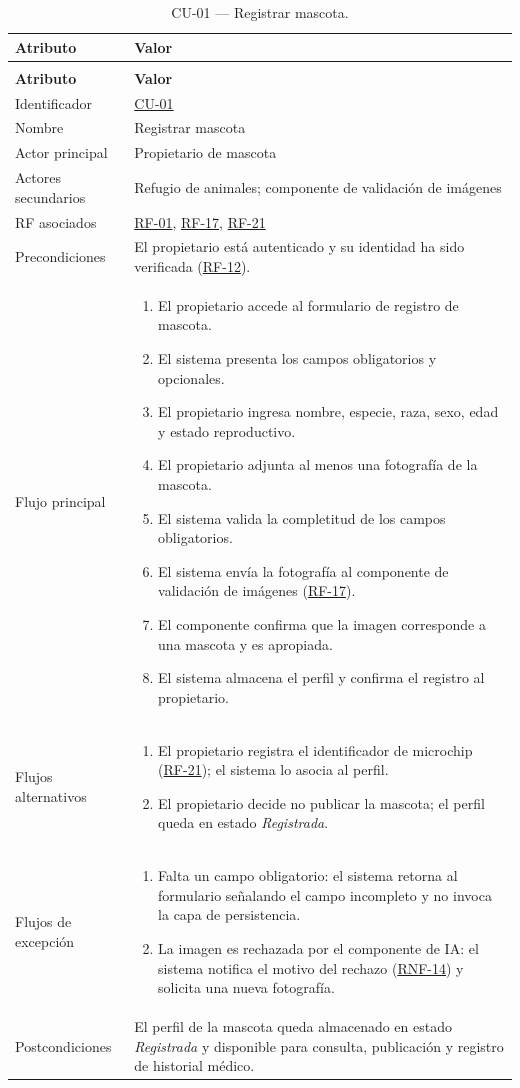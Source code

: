 \documentclass[journal,onecolumn]{IEEEtran}
\makeatletter
\newenvironment{atributos}[2]{%
	\small
	\begin{longtable}{@{}>{\raggedright\arraybackslash}p{4.2cm} >{\raggedright\arraybackslash}p{11.2cm}@{}}
		\caption{#2}\label{tab:#1}\\
		\toprule
		\textbf{Atributo} & \textbf{Valor} \\
		\midrule
		\endfirsthead
		\multicolumn{2}{@{}l}{\small\itshape (continuación)}\\
		\toprule
		\textbf{Atributo} & \textbf{Valor} \\
		\midrule
		\endhead
		\bottomrule
		\endlastfoot
	}{%
	\end{longtable}
	\normalsize
}
\makeatother
\begin{document}
	\begin{atributos}{CU-01}{CU-01 --- Registrar mascota.}
		Identificador & \hyperref[tab:CU-01]{CU-01} \\
		Nombre & Registrar mascota \\
		Actor principal & Propietario de mascota \\
		Actores secundarios & Refugio de animales; componente de validación de imágenes \\
		RF asociados & \hyperref[tab:RF-01]{RF-01}, \hyperref[tab:RF-17]{RF-17}, \hyperref[tab:RF-21]{RF-21} \\
		Precondiciones & El propietario está autenticado y su identidad ha sido verificada (\hyperref[tab:RF-12]{RF-12}). \\
		Flujo principal &
		\begin{enumerate}[leftmargin=*, nosep]
			\item El propietario accede al formulario de registro de mascota.
			\item El sistema presenta los campos obligatorios y opcionales.
			\item El propietario ingresa nombre, especie, raza, sexo, edad y estado reproductivo.
			\item El propietario adjunta al menos una fotografía de la mascota.
			\item El sistema valida la completitud de los campos obligatorios.
			\item El sistema envía la fotografía al componente de validación de imágenes (\hyperref[tab:RF-17]{RF-17}).
			\item El componente confirma que la imagen corresponde a una mascota y es apropiada.
			\item El sistema almacena el perfil y confirma el registro al propietario.
		\end{enumerate} \\
		Flujos alternativos &
		\begin{enumerate}[leftmargin=*, nosep]
			\item[3.1] El propietario registra el identificador de microchip (\hyperref[tab:RF-21]{RF-21}); el sistema lo asocia al perfil.
			\item[8.1] El propietario decide no publicar la mascota; el perfil queda en estado \emph{Registrada}.
		\end{enumerate} \\
		Flujos de excepción &
		\begin{enumerate}[leftmargin=*, nosep]
			\item[5.1] Falta un campo obligatorio: el sistema retorna al formulario señalando el campo incompleto y no invoca la capa de persistencia.
			\item[7.1] La imagen es rechazada por el componente de IA: el sistema notifica el motivo del rechazo (\hyperref[tab:RNF-14]{RNF-14}) y solicita una nueva fotografía.
		\end{enumerate} \\
		Postcondiciones & El perfil de la mascota queda almacenado en estado \emph{Registrada} y disponible para consulta, publicación y registro de historial médico. \\
	\end{atributos}
	
\end{document}
